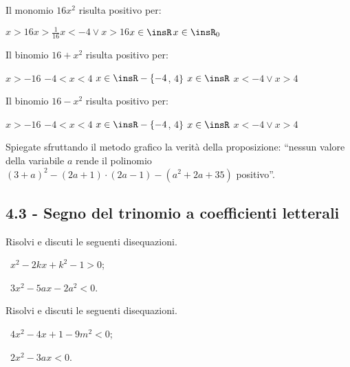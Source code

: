\begin{esercizio}
\label{ese:4.23}
Il monomio $16x^2$ risulta positivo per:

\boxA\quad $x>16$\qquad \boxB\quad $x>\frac 1{16}$\qquad\boxC\quad $x<-4\vee x>16$\qquad\boxD\quad $x\in \insR$\qquad\boxE\quad $x\in \insR_0$

\end{esercizio}

\begin{esercizio}
\label{ese:4.24}
Il binomio $16+x^2$ risulta positivo per:

\boxA\; $x>-16$\quad \boxB\; $-4<x<4$ \quad\boxC\; $x\in \insR-\{-4$, $4\}$ \quad\boxD\; $x\in \insR$ \quad\boxE\; $x<-4\vee x>4$
\end{esercizio}

\begin{esercizio}
\label{ese:4.25}
Il binomio $16-x^2$ risulta positivo per:

\boxA\; $x>-16$\quad \boxB\; $-4<x<4$ \quad\boxC\; $x\in \insR-\{-4$, $4\}$ \quad\boxD\; $x\in \insR$ \quad\boxE\; $x<-4\vee x>4$
\end{esercizio}

\begin{esercizio}
 \label{ese:4.26}
Spiegate sfruttando il metodo grafico la verità della proposizione: ``nessun valore della variabile $a$ rende il polinomio $(3+a)^2-(2a+1)\cdot (2a-1)-(a^2+2a+35)$ positivo''.
\end{esercizio}

\subsection*{4.3 - Segno del trinomio a coefficienti letterali}

\begin{esercizio}[\Ast]
 \label{ese:4.27}
Risolvi e discuti le seguenti disequazioni.
\begin{multicols}{2}
 \begin{enumeratea}
 \item~$x^2-2{kx}+k^2-1>0$;
 \item~$3x^2-5{ax}-2a^2<0$.
 \end{enumeratea}
 \end{multicols}
\end{esercizio}

\begin{esercizio}[\Ast]
 \label{ese:4.28}
Risolvi e discuti le seguenti disequazioni.
\begin{multicols}{2}
 \begin{enumeratea}
 \item~$4x^2-4x+1-9m^2<0$;
 \item~$2x^2-3{ax}<0$.
 \end{enumeratea}
 \end{multicols}
\end{esercizio}

